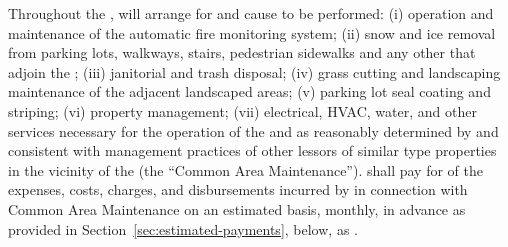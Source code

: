 Throughout the \termOfLease, \lessor will arrange for and cause to be performed: (i) operation and maintenance of the automatic fire monitoring system; (ii) snow and ice removal from parking lots, walkways, stairs, pedestrian sidewalks and any other \commonAreas that adjoin the \building; (iii) janitorial and trash disposal; (iv) grass cutting and landscaping maintenance of the adjacent landscaped areas; (v) parking lot seal coating and striping; (vi) property management; (vii) electrical, HVAC, water, and other services necessary for the operation of the \building and \commonAreas as reasonably determined by \lessor and consistent with management practices of other lessors of similar type properties in the vicinity of the \building (the ``Common Area Maintenance''). \lessee shall pay for \lesseesPercentage of the expenses, costs, charges, and disbursements incurred by \lessor in connection with Common Area Maintenance on an estimated basis, monthly, in advance as provided in Section~\ref{sec:estimated-payments}, below, as \additionalRent.
